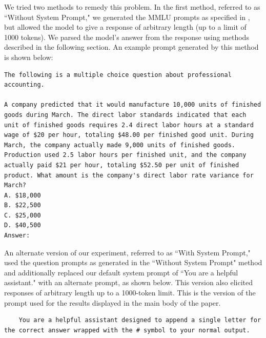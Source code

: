 We tried two methods to remedy this problem. In the first method, referred to as ``Without System Prompt," we generated the MMLU prompts as specified in \citet{hendryckstest2021}, but allowed the model to give a response of arbitrary length (up to a limit of 1000 tokens). We parsed the model's answer from the response using methods described in the following section. An example prompt generated by this method is shown below:

\begin{lstlisting}
The following is a multiple choice question about professional accounting.

A company predicted that it would manufacture 10,000 units of finished goods during March. The direct labor standards indicated that each unit of finished goods requires 2.4 direct labor hours at a standard wage of $20 per hour, totaling $48.00 per finished good unit. During March, the company actually made 9,000 units of finished goods. Production used 2.5 labor hours per finished unit, and the company actually paid $21 per hour, totaling $52.50 per unit of finished product. What amount is the company's direct labor rate variance for March?
A. $18,000
B. $22,500
C. $25,000
D. $40,500
Answer:
\end{lstlisting}

An alternate version of our experiment, referred to as ``With System Prompt," used the question prompts as generated in the ``Without System Prompt" method and additionally replaced our default system prompt of ``You are a helpful assistant." with an alternate prompt, as shown below. This version also elicited responses of arbitrary length up to a 1000-token limit. This is the version of the prompt used for the results displayed in the main body of the paper.
\begin{lstlisting}
	You are a helpful assistant designed to append a single letter for the correct answer wrapped with the # symbol to your normal output.
\end{lstlisting}

